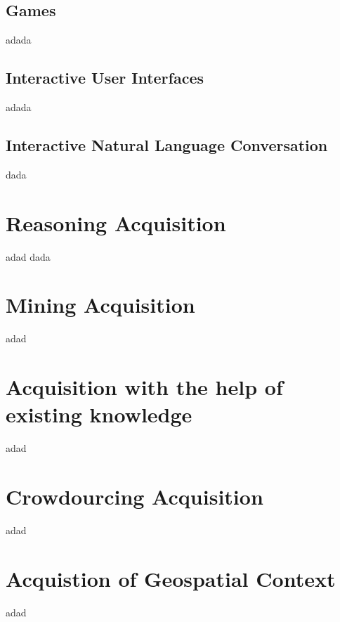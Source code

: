 \subsection{Games}
adada
\subsection{Interactive User Interfaces}
adada

\subsection{Interactive Natural Language Conversation}
dada

\section{Reasoning Acquisition}
adad dada

\section{Mining Acquisition}
adad

\section{Acquisition with the help of existing knowledge}
adad

\section{Crowdourcing Acquisition}
adad

\section{Acquistion of Geospatial Context}
adad
